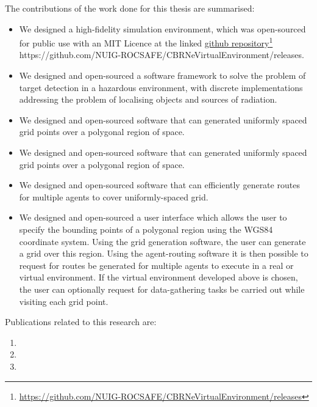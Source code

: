 The contributions of the work done for this thesis are summarised:
\begin{itemize}
    \item We designed a high-fidelity simulation environment, which was open-sourced for public use with an MIT Licence at the linked \href{https://github.com/NUIG-ROCSAFE/CBRNeVirtualEnvironment/releases}{github repository}\footnote{\href {https://github.com/NUIG-ROCSAFE/CBRNeVirtualEnvironment/releases}{https://github.com/NUIG-ROCSAFE/CBRNeVirtualEnvironment/releases}} https://github.com/NUIG-ROCSAFE/CBRNeVirtualEnvironment/releases.
    \item We designed and open-sourced a software framework to solve the problem of target detection in a hazardous environment, with discrete implementations addressing the problem of localising objects and sources of radiation.
    \item We designed and open-sourced software that can generated uniformly spaced grid points over a polygonal region of space.
    \item We designed and open-sourced software that can generated uniformly spaced grid points over a polygonal region of space.
    \item We designed and open-sourced software that can efficiently generate routes for multiple agents to cover uniformly-spaced grid.
    \item We designed and open-sourced a user interface which allows the user to specify the bounding points of a polygonal region using the WGS84 coordinate system. Using the grid generation  software, the user can generate a grid over this region. Using the agent-routing software it is then possible to request for routes be generated for multiple agents to execute in a real or virtual environment. If the virtual environment developed above is chosen, the user can optionally request for data-gathering tasks be carried out while visiting each grid point.
\end{itemize}

Publications related to this research are:
\begin{enumerate}
    \item {}
    \item {}
    \item {}

\end{enumerate}